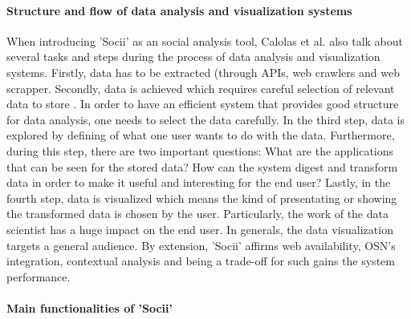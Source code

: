 \paragraph{Structure and flow of data analysis and visualization systems}

When introducing 'Socii' as an social analysis tool, Calolas et al. also talk about several tasks and steps during the process of data analysis and visualization systems. Firstly, data has to be extracted (through APIs, web crawlers and web scrapper. Secondly, data is achieved which requires careful selection of relevant data to store \cite{trends_nosql}. In order to have an efficient system that provides good structure for data analysis, one needs to select the data carefully. In the third step, data is explored by defining of what one user wants to do with the data. Furthermore, during this step, there are two important questions: What are the applications that can be seen for the stored data? How can the system digest and transform data in order to make it useful and interesting for the end user? 
Lastly, in the fourth step, data is visualized which means the kind of presentating or showing the transformed data is chosen by the user. Particularly, the work of the data scientist has a huge impact on the end user. In generals, the data visualization targets a general audience.  
By extension, 'Socii' affirms web availability, OSN's  integration, contextual analysis and being a trade-off for such gains the system performance.

\paragraph{Main functionalities of 'Socii'}

